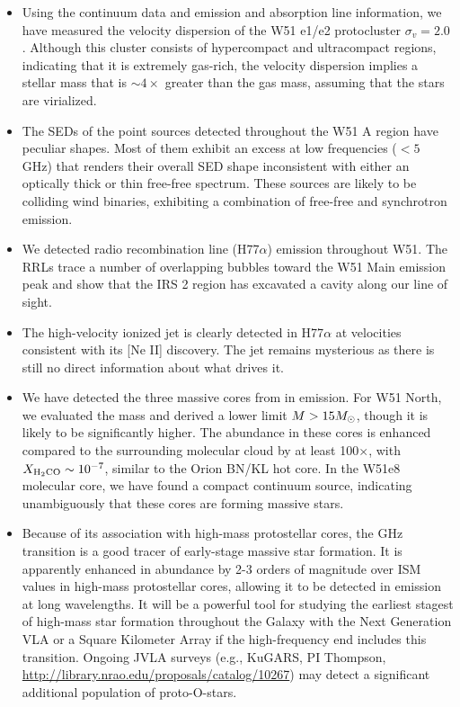 \begin{itemize}
    \item Using the continuum data and \formaldehyde emission and absorption line
information, we have measured the velocity dispersion of the W51 e1/e2
protocluster $\sigma_v=2.0$ \kms.  Although this cluster consists of
hypercompact and ultracompact \hii regions, indicating that it is extremely
gas-rich, the velocity dispersion implies a stellar mass that is $\sim4\times$
greater than the gas mass, assuming that the stars are virialized.

\item The SEDs of the point sources detected throughout the W51 A region have
peculiar shapes.  Most of them exhibit an excess at low frequencies ($<5$ GHz)
that renders their overall SED shape inconsistent with either an optically
thick or thin free-free spectrum.  These sources are likely to be colliding
wind binaries, exhibiting a combination of free-free and synchrotron emission.


\item We detected radio recombination line (H77$\alpha$) emission throughout
    W51.  The RRLs trace a number of overlapping bubbles toward the W51 Main
    emission peak and show that the IRS 2 region has excavated a cavity along
    our line of sight.  

\item The \citet{Lacy2007a} high-velocity ionized jet is clearly detected in
    H77$\alpha$ at velocities consistent with its [Ne II] discovery.
    The jet remains mysterious as there is still no direct information about
    what drives it.  

\item We have detected the three massive cores from \citet{Zhang1997a} in
\formaldehyde \twotwo emission.  For W51 North, we evaluated the mass and
derived a lower limit $M>15 M_{\odot}$, though it is likely to be significantly
higher.  The \formaldehyde abundance in these cores is enhanced compared to the
surrounding molecular cloud by at least 100$\times$, with $X_{\textrm{H}_2\textrm{CO}}
\sim 10^{-7}$, similar to the Orion BN/KL hot core.  In the W51e8 molecular
core, we have found a compact continuum source, indicating unambiguously that
these cores are forming massive stars.

\item Because of its association with high-mass protostellar cores,
    the \formaldehyde {} GHz transition is a good tracer of
    early-stage massive star formation.  It is apparently enhanced in
    abundance by 2-3
orders of magnitude over ISM values in high-mass protostellar cores, allowing
it to be detected in emission at long wavelengths.  It will be a powerful tool
for studying the earliest stagest of high-mass star formation throughout the
Galaxy with the Next Generation VLA or a Square Kilometer Array if the
high-frequency end includes this transition.  Ongoing JVLA surveys (e.g.,
KuGARS, PI Thompson, \url{http://library.nrao.edu/proposals/catalog/10267}) may
detect a significant additional population of proto-O-stars.


\end{itemize}
